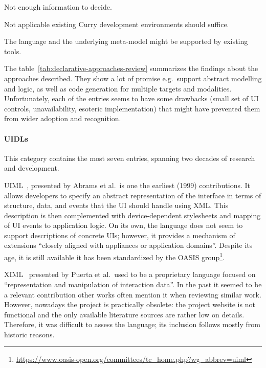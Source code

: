 \begin{table}[]
\begin{threeparttable}[b]
\begin{tabularx}{\textwidth}{lrCCC}
            \bottomrule
        \end{tabularx}
        \begin{tablenotes}
            \item [1] Not enough information to decide.
            \item [2] Not applicable\,\textemdash\,existing Curry development environments should suffice.
            \item [3] The language and the underlying meta-model might be supported by existing tools.
        \end{tablenotes}
    \end{threeparttable}
\end{table}

The table~\ref{tab:declarative-approaches-review} summarizes the findings about the approaches described.
They show a lot of promise\,\textemdash\,e.g.\ support abstract modelling and logic, as well as code generation for multiple targets and modalities.
Unfortunately, each of the entries seems to have some drawbacks (small set of UI controls, unavailability, esoteric implementation) that might have prevented them from wider adoption and recognition.

\paragraph{UIDLs}

This category contains the most\,\textemdash\,seven\,\textemdash\,entries, spanning two decades of research and development.

UIML~\cite{Abrams1999-ei}, presented by Abrams et al.\ is one the earliest (1999) contributions.
It allows developers to specify an abstract representation of the interface in terms of structure, data, and events that the UI should handle using XML.
This description is then complemented with device-dependent stylesheets and mapping of UI events to application logic.
On its own, the language does not seem to support descriptions of concrete UIs;
however, it provides a mechanism of extensions \enquote{closely aligned with appliances or application domains}.
Despite its age, it is still available\,\textemdash\,it has been standardized by the OASIS group\footnote{\url{https://www.oasis-open.org/committees/tc_home.php?wg_abbrev=uiml}}.

XIML~\cite{puerta2001ximl} presented by Puerta et al.\ used to be a proprietary language focused on \enquote{representation and manipulation of interaction data}.
In the past it seemed to be a relevant contribution\,\textemdash\,other works often mention it when reviewing similar work.
However, nowadays the project is practically obsolete: the project website is not functional and the only available literature sources are rather low on details.
Therefore, it was difficult to assess the language;
its inclusion follows mostly from historic reasons.

